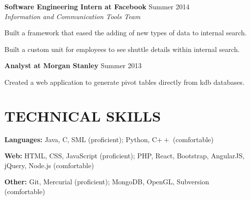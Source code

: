 \documentclass[margin, 11pt]{res} %
\begin{document}
\begin{resume}
\vspace{3pt}

{\bf Software Engineering Intern at Facebook} \hfill {\small Summer 2014}\\
{\small {\sl Information and Communication Tools Team}}

\begin{itemize} \itemsep -2pt
{\small
\item Built a framework that eased the adding of new types of data to internal search.
\item Built a custom unit for employees to see shuttle details within internal search.
}
\end{itemize}

\vspace{3pt}

{\bf Analyst at Morgan Stanley} \hfill {\small Summer 2013}
\begin{itemize} \itemsep -2pt %
{\small
\item Created a web application to generate pivot tables directly from kdb databases.
}
\end{itemize}


\section{TECHNICAL SKILLS}

{\bf Languages:}
Java, C, SML (proficient); Python, C$++$ (comfortable)

\vspace{5pt}

{\bf Web:}
HTML, CSS, JavaScript (proficient); PHP, React, Bootstrap, AngularJS, jQuery, Node.js (comfortable)

\vspace{5pt}

{\bf Other:}
Git, Mercurial (proficient); MongoDB, OpenGL, Subversion (comfortable)



\end{resume}
\end{document}
